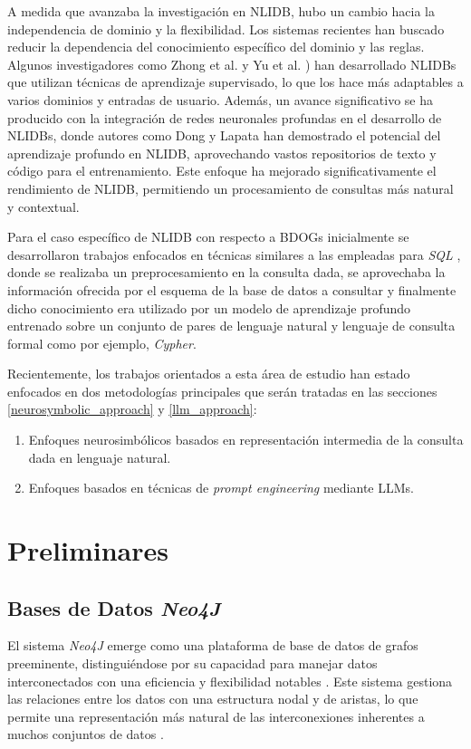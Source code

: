 A medida que avanzaba la investigación en NLIDB, hubo un cambio hacia la independencia de dominio y la flexibilidad. Los sistemas recientes han buscado reducir la dependencia del conocimiento específico del dominio y las reglas. Algunos investigadores como Zhong et al. \cite{zhongetal2017} y Yu et al. \cite{yuetal2018}) han desarrollado NLIDBs que utilizan técnicas de aprendizaje supervisado, lo que los hace más adaptables a varios dominios y entradas de usuario. Además, un avance significativo se ha producido con la integración de redes neuronales profundas en el desarrollo de NLIDBs, donde autores como Dong y Lapata \cite{dongandlapata2016} han demostrado el potencial del aprendizaje profundo en NLIDB, aprovechando vastos repositorios de texto y código para el entrenamiento. Este enfoque ha mejorado significativamente el rendimiento de NLIDB, permitiendo un procesamiento de consultas más natural y contextual.

Para el caso específico de NLIDB con respecto a BDOGs inicialmente se desarrollaron trabajos enfocados en técnicas similares a las empleadas para \textit{SQL} \cite{adrianbazaga2021} \cite{hainsetal2020}, donde se realizaba un preprocesamiento en la consulta dada, se aprovechaba la información ofrecida por el esquema \cite{dbschema} de la base de datos a consultar y finalmente dicho conocimiento era utilizado por un modelo de aprendizaje profundo entrenado sobre un conjunto de pares de lenguaje natural y lenguaje de consulta formal como por ejemplo, \textit{Cypher}.

Recientemente, los trabajos orientados a esta área de estudio han estado enfocados en dos metodologías principales que serán tratadas en las secciones \ref{neurosymbolic_approach} y \ref{llm_approach}:
\begin{enumerate}
	\item Enfoques neurosimbólicos basados en representación intermedia de la consulta dada en lenguaje natural.
	\item Enfoques basados en técnicas de \textit{prompt engineering} mediante LLMs.
\end{enumerate}

\section{Preliminares} \label{prelude}

\subsection{Bases de Datos \textit{Neo4J}} \label{neo4jdbs}
El sistema \textit{Neo4J} emerge como una plataforma de base de datos de grafos preeminente, distinguiéndose por su capacidad para manejar datos interconectados con una eficiencia y flexibilidad notables \cite{robinsonwebbereifrem2015}. Este sistema gestiona las relaciones entre los datos con una estructura nodal y de aristas, lo que permite una representación más natural de las interconexiones inherentes a muchos conjuntos de datos \cite{millerandrodriguez2013}.

